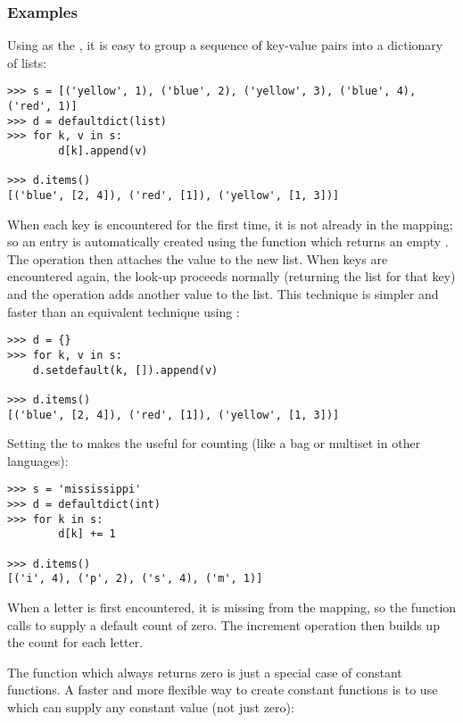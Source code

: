\subsubsection{ Examples \label{defaultdict-examples}}

Using  as the , it is easy to group
a sequence of key-value pairs into a dictionary of lists:

\begin{verbatim}
>>> s = [('yellow', 1), ('blue', 2), ('yellow', 3), ('blue', 4), ('red', 1)]
>>> d = defaultdict(list)
>>> for k, v in s:
        d[k].append(v)

>>> d.items()
[('blue', [2, 4]), ('red', [1]), ('yellow', [1, 3])]
\end{verbatim}

When each key is encountered for the first time, it is not already in the
mapping; so an entry is automatically created using the
 function which returns an empty .  The
 operation then attaches the value to the new list.  When
keys are encountered again, the look-up proceeds normally (returning the list
for that key) and the  operation adds another value to
the list. This technique is simpler and faster than an equivalent technique
using :

\begin{verbatim}
>>> d = {}
>>> for k, v in s:
	d.setdefault(k, []).append(v)

>>> d.items()
[('blue', [2, 4]), ('red', [1]), ('yellow', [1, 3])]
\end{verbatim}

Setting the  to  makes the
 useful for counting (like a bag or multiset in other
languages):

\begin{verbatim}
>>> s = 'mississippi'
>>> d = defaultdict(int)
>>> for k in s:
        d[k] += 1

>>> d.items()
[('i', 4), ('p', 2), ('s', 4), ('m', 1)]
\end{verbatim}

When a letter is first encountered, it is missing from the mapping, so the
 function calls  to supply a default
count of zero.  The increment operation then builds up the count for each
letter.

The function  which always returns zero is just a special
case of constant functions.  A faster and more flexible way to create
constant functions is to use  which can supply
any constant value (not just zero):

